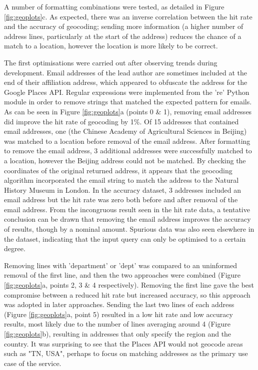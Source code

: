 \documentclass[Report.tex]{subfiles}
\begin{document}
\noindent A number of formatting combinations were tested, as detailed in Figure \ref{fig:geoplots}c. As expected, there was an inverse correlation between the hit rate and the accuracy of geocoding; sending more information (a higher number of address lines, particularly at the start of the address) reduces the chance of a match to a location, however the location is more likely to be correct.\newline

\noindent The first optimisations were carried out after observing trends during development. Email addresses of the lead author are sometimes included at the end of their affiliation address, which appeared to obfuscate the address for the Google Places API. Regular expressions were implemented from the 're' Python module in order to remove strings that matched the expected pattern for emails. As can be seen in Figure \ref{fig:geoplots}a (points 0 \& 1), removing email addresses did improve the hit rate of geocoding by 1\%. Of 15 addresses that contained email addresses, one (the Chinese Academy of Agricultural Sciences in Beijing) was matched to a location before removal of the email address. After formatting to remove the email address, 3 additional addresses were successfully matched to a location, however the Beijing address could not be matched. By checking the coordinates of the original returned address, it appears that the geocoding algorithm incorporated the email string to match the address to the Natural History Museum in London. In the accuracy dataset, 3 addresses included an email address but the hit rate was zero both before and after removal of the email address. From the incongruous result seen in the hit rate data, a tentative conclusion can be drawn that removing the email address improves the accuracy of results, though by a nominal amount. Spurious data was also seen elsewhere in the dataset, indicating that the input query can only be optimised to a certain degree.\newline

\noindent Removing lines with 'department' or 'dept' was compared to an uninformed removal of the first line, and then the two approaches were combined (Figure \ref{fig:geoplots}a, points 2, 3 \& 4 respectively). Removing the first line gave the best compromise between a reduced hit rate but increased accuracy, so this approach was adopted in later approaches. Sending the last two lines of each address (Figure \ref{fig:geoplots}a, point 5) resulted in a low hit rate and low accuracy results, most likely due to the number of lines averaging around 4 (Figure \ref{fig:geoplots}b), resulting in addresses that only specify the region and the country. It was surprising to see that the Places API would not geocode areas such as "TN, USA", perhaps to focus on matching addresses as the primary use case of the service.\newline
\end{document}
